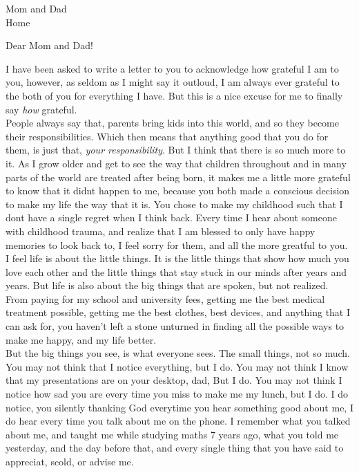 \documentclass[12pt]{letter}
\begin{document}
\begin{letter}{Mom and Dad \\ Home }
\opening{Dear Mom and Dad!}

I have been asked to write a letter to you to acknowledge how grateful I am to you, however, as seldom as I might say it outloud, 
I am always ever grateful to the both of you for everything I have. But this is a nice excuse for me to finally say \textit{how} grateful.\\

People always say that, parents bring kids into this world, and so they become their responsibilities. Which then means that anything
good that you do for them, is just that, \textit{your responsibility}. But I think that there is so much more to it. As I grow older and 
get to see the way that children throughout and in many parts of the world are treated after being born, it makes me a little more grateful
to know that it didnt happen to me, because you both made a conscious decision to make my life the way that it is. You chose to make my
childhood such that I dont have a single regret when I think back. Every time I hear about someone with childhood trauma, and realize that I am 
blessed to only have happy memories to look back to, I feel sorry for them, and all the more greatful to you. \\

I feel life is about the little things. It is the little things that show how much you love each other and the little things that 
stay stuck in our minds after years and years. But life is also about the big things that are spoken, but not realized. From paying for my school
and university fees, getting me the best medical treatment possible, getting me the best clothes, best devices, and anything that I can 
ask for, you haven't left a stone unturned in finding all the possible ways to make me happy, and my life better.\\

But the big things you see, is what everyone sees. The small things, not so much. You may not think that I notice everything, but I do.
You may not think I know that my presentations are on your desktop, dad, But I do. You may not think I notice how sad you are every time you miss
to make me my lunch, but I do. I do notice, you silently thanking God everytime you hear something good about me, I do hear every time 
you talk about me on the phone. I remember what you talked about me, and taught me while studying maths 7 years ago, what you told me yesterday, 
and the day before that, and every single thing that you have said to appreciat, scold, or advise me.\\
\vspace{1cm}


\end{letter}
\end{document}
